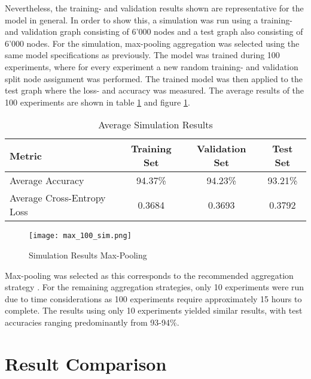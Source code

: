   \noindent Nevertheless, the training- and validation results shown are 
  representative for the model in general. In order to show this, a simulation 
  was run using a training- and validation graph consisting of 6'000 nodes and 
  a test graph also consisting of 6'000 nodes. For the simulation, max-pooling 
  aggregation was selected using the same model specifications as previously. 
  The model was trained during 100 experiments, where for every experiment a 
  new random training- and validation split node assignment was performed. The
  trained model was then applied to the test graph where the loss- and accuracy
  was measured. The average results of the 100 experiments are shown in table
  \ref{table:simulation_results} and figure \ref{fig:simulation_results}. 

  \begin{table}[h]
    \centering
      \begin{tabular}{|l||c|c|c|}
      \hline
      \textbf{Metric} & \textbf{Training Set} & \textbf{Validation Set} & 
      \textbf{Test Set}\\
      \hline\hline
      Average Accuracy & 94.37\% & 94.23\% & 93.21\% \\\hline 
      Average Cross-Entropy Loss & 0.3684 & 0.3693 & 0.3792 \\
      \hline
    \end{tabular}
    \caption{Average Simulation Results}
    \label{table:simulation_results}
  \end{table}

  \begin{figure}[h]
		\centering
		\texttt{[image: max\_100\_sim.png]}
		\caption{Simulation Results Max-Pooling}
        \label{fig:simulation_results}
  \end{figure}

  \noindent Max-pooling was selected as this corresponds to the recommended
  aggregation strategy \citep[p. 9]{hamilton2017inductive}. For the remaining
  aggregation strategies, only 10 experiments were run due to time
  considerations as 100 experiments require approximately 15 hours to complete.
  The results using only 10 experiments yielded similar results, with test
  accuracies ranging predominantly from 93-94\%. 

  \section{Result Comparison}
  \label{section:result_comp}


